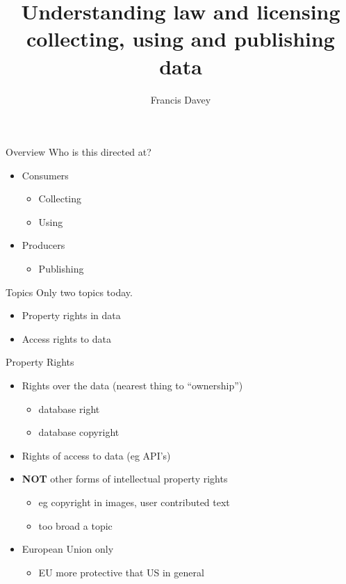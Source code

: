 \documentclass{beamer}
\title{Understanding law and licensing\\
collecting, using and publishing data}
\author{Francis Davey}
\begin{document}
\begin{frame}
  \titlepage
\end{frame}

\begin{frame}{Overview}
Who is this directed at?
  \begin{itemize}
  \item Consumers
    \begin{itemize}
    \item Collecting
    \item Using
    \end{itemize}
  \item Producers
    \begin{itemize}
    \item Publishing
    \end{itemize}
  \end{itemize}
\end{frame}

\begin{frame}{Topics}
Only two topics today.
  \begin{itemize}
  \item Property rights in data
  \item Access rights to data
  \end{itemize}
\end{frame}

\begin{frame}{Property Rights}
  \begin{itemize}
  \item Rights over the data (nearest thing to ``ownership'')
    \begin{itemize}
    \item database right
    \item database copyright
    \end{itemize}
  \item Rights of access to data (eg API's)
  \item {\bf NOT} other forms of intellectual property rights
    \begin{itemize}
    \item eg copyright in images, user contributed text
    \item too broad a topic
    \end{itemize}
  \item European Union only
    \begin{itemize}
    \item EU more protective that US in general
    \end{itemize}
  \end{itemize}
\end{frame}
\end{document}
